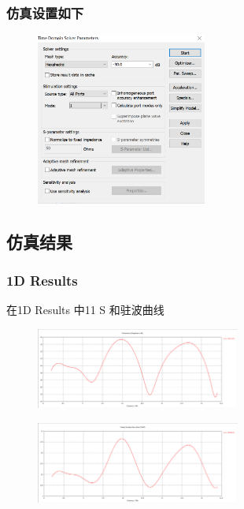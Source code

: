 \documentclass{../source/zjureport}
\begin{document}
            \subsubsection{仿真设置如下}
            \begin{figure}[htp]
                \centering
                \includegraphics[width = 0.5\textwidth]{figure/仿真设置.png}
            \end{figure}

        \subsection{仿真结果}
            \subsubsection{1D Results}
            在1D Results 中11 S 和驻波曲线
            \begin{figure}[htp]
                \centering
                \includegraphics[width = 0.6\textwidth]{figure/s11.png}
            \end{figure}
            \begin{figure}[htp]
                \centering
                \includegraphics[width = 0.6\textwidth]{figure/驻波比.png}
            \end{figure}
\end{document}
